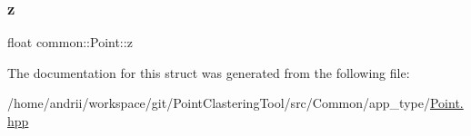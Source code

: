 \subsubsection{\texorpdfstring{z}{z}}
{\footnotesize\ttfamily float common\+::\+Point\+::z}



The documentation for this struct was generated from the following file\+:\begin{DoxyCompactItemize}
\item 
/home/andrii/workspace/git/\+Point\+Clastering\+Tool/src/\+Common/app\+\_\+type/\mbox{\hyperlink{Point_8hpp}{Point.\+hpp}}\end{DoxyCompactItemize}
